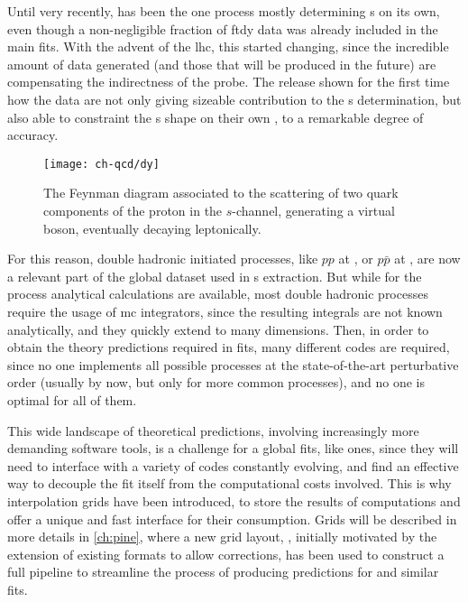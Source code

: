 Until very recently, \dis has been the one process mostly determining \pdf{}s
on its own, even though a non-negligible fraction of \acrfull{ftdy} data was
already included in the main fits.
%
With the advent of the \acrfull{lhc}, this started changing, since the
incredible amount of data generated (and those that will be produced in the
future) are compensating the indirectness of the probe.
%
The  release shown for the first time how the \lhc data are not
only giving sizeable contribution to the \pdf{}s determination, but also able
to constraint the \pdf{}s shape on their own \cite{Ball:2021leu}, to a
remarkable degree of accuracy.

\begin{figure}
	\centering
	\texttt{[image: ch-qcd/dy]}
	\caption{
		The \lo Feynman diagram associated to the scattering of two quark
		components of the proton in the $s$-channel, generating a virtual \ew
		boson, eventually decaying leptonically.
	}
	\label{fig:qcd/dy}
\end{figure}

For this reason, double hadronic initiated processes, like $pp$ at \lhc, or
$p\bar{p}$ at \tevatron, are now a relevant part of the global \qcd dataset
used in \pdf{}s extraction.
%
But while for the \dis process analytical calculations are available, most
double hadronic processes require the usage of \acrfull{mc} integrators, since
the resulting integrals are not known analytically, and they quickly extend to
many dimensions.
%
Then, in order to obtain the theory predictions required in \pdf fits, many
different codes are required, since no one implements all possible processes at
the state-of-the-art perturbative order (usually \nnlo by now, but only for
more common processes), and no one is optimal for all of them.

This wide landscape of theoretical predictions, involving increasingly more
demanding software tools, is a challenge for a global \qcd fits, like \pdf
ones, since they will need to interface with a variety of codes constantly
evolving, and find an effective way to decouple the fit itself from the
computational costs involved.
%
This is why interpolation grids have been introduced, to store the results of
\mc computations and offer a unique and fast interface for their consumption.
Grids will be described in more details in \cref{ch:pine}, where a new grid
layout, \pineappl \cite{Carrazza:2020gss}, initially motivated by the extension
of existing formats to allow \ew corrections, has been used to construct a full
pipeline to streamline the process of producing predictions for \pdf and
similar fits.


